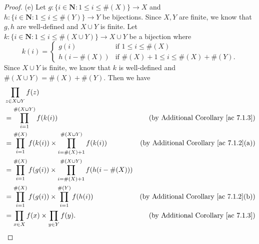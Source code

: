\begin{proof}{(e)}
    Let \(g : \{i \in \mathbf{N} : 1 \leq i \leq \#(X)\} \to X\) and \(h : \{i \in \mathbf{N} : 1 \leq i \leq \#(Y)\} \to Y\) be bijections.
    Since \(X, Y\) are finite, we know that \(g, h\) are well-defined and \(X \cup Y\) is finite.
    Let \(k : \{i \in \mathbf{N} : 1 \leq i \leq \#(X \cup Y)\} \to X \cup Y\) be a bijection where
    \[
        k(i) = \begin{cases}
            g(i)         & \text{if } 1 \leq i \leq \#(X)                  \\
            h(i - \#(X)) & \text{if } \#(X) + 1 \leq i \leq \#(X) + \#(Y).
        \end{cases}
    \]
    Since \(X \cup Y\) is finite, we know that \(k\) is well-defined and \(\#(X \cup Y) = \#(X) + \#(Y)\).
    Then we have
    \begin{align*}
         & \prod_{z \in X \cup Y} f(z)                                                                                                                      \\
         & = \prod_{i = 1}^{\#(X \cup Y)} f(k(i))                                                      & \text{(by Additional Corollary \ref{ac 7.1.3})}    \\
         & = \prod_{i = 1}^{\#(X)} f(k(i)) \times \prod_{i = \#(X) + 1}^{\#(X \cup Y)} f(k(i))         & \text{(by Additional Corollary \ref{ac 7.1.2}(a))} \\
         & = \prod_{i = 1}^{\#(X)} f(g(i)) \times \prod_{i = \#(X) + 1}^{\#(X \cup Y)} f(h(i - \#(X)))                                                      \\
         & = \prod_{i = 1}^{\#(X)} f(g(i)) \times \prod_{i = 1}^{\#(Y)} f(h(i))                        & \text{(by Additional Corollary \ref{ac 7.1.2}(b))} \\
         & = \prod_{x \in X} f(x) \times \prod_{y \in Y} f(y).                                         & \text{(by Additional Corollary \ref{ac 7.1.3})}
    \end{align*}
\end{proof}

